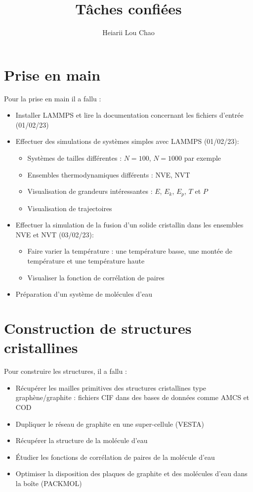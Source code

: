 \documentclass[11pt, a4paper]{article}
\author{Heiarii Lou Chao}
\title{Tâches confiées}
\begin{document}
\maketitle
\tableofcontents

\clearpage
\section{Prise en main}

Pour la prise en main il a fallu :
\begin{itemize}
	\item Installer LAMMPS et lire la documentation concernant les fichiers d'entrée (01/02/23)
	\item Effectuer des simulations de systèmes simples avec LAMMPS (01/02/23):
	\begin{itemize}[label={$\rightarrow$}]
		\item Systèmes de tailles différentes : $N = \num{100}$, $N = \num{1000}$ par exemple
		\item Ensembles thermodynamiques différents : NVE, NVT
		\item Visualisation de grandeurs intéressantes : $E$, $E_{k}$, $E_{p}$, $T$ et $P$
		\item Visualisation de trajectoires
	\end{itemize}
	\item Effectuer la simulation de la fusion d'un solide cristallin dans les ensembles NVE et NVT (03/02/23):
	\begin{itemize}[label={$\rightarrow$}]
		\item Faire varier la température : une température basse, une montée de température et une température haute
		\item Visualiser la fonction de corrélation de paires
	\end{itemize}
	\item Préparation d'un système de molécules d'eau
\end{itemize}

\section{Construction de structures cristallines}

Pour construire les structures, il a fallu :
\begin{itemize}
	\item Récupérer les mailles primitives des structures cristallines type graphène/graphite : fichiers CIF dans des bases de données comme AMCS et COD
	\item Dupliquer le réseau de graphite en une super-cellule (VESTA)
	\item Récupérer la structure de la molécule d'eau
	\item Étudier les fonctions de corrélation de paires de la molécule d'eau
	\item Optimiser la disposition des plaques de graphite et des molécules d'eau dans la boîte (PACKMOL)
\end{itemize}
\end{document}
